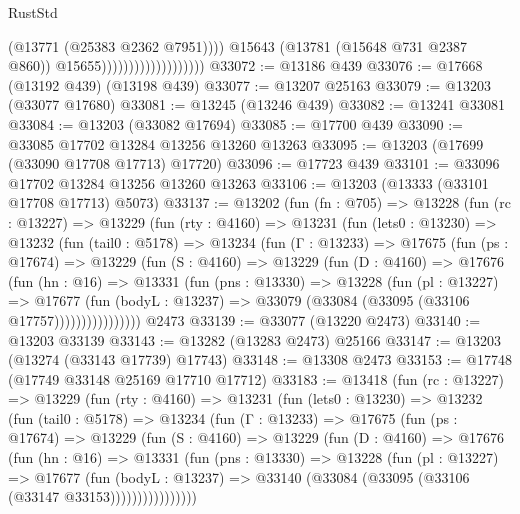 \begin{lexlean}{RustStd}
\begin{coremodule}
                                              (@13771 (@25383 @2362 @7951))))
                                          @15643
                                          (@13781 (@15648 @731 @2387 @860))
                                          @15655)))))))))))))))))))
@33072 := @13186 @439
@33076 := @17668 (@13192 @439) (@13198 @439)
@33077 := @13207 @25163
@33079 := @13203 (@33077 @17680)
@33081 := @13245 (@13246 @439)
@33082 := @13241 @33081
@33084 := @13203 (@33082 @17694)
@33085 := @17700 @439
@33090 := @33085 @17702 @13284 @13256 @13260 @13263
@33095 := @13203 (@17699 (@33090 @17708 @17713) @17720)
@33096 := @17723 @439
@33101 := @33096 @17702 @13284 @13256 @13260 @13263
@33106 := @13203 (@13333 (@33101 @17708 @17713) @5073)
@33137 := @13202
    (fun (fn : @705) =>
    @13228
      (fun (rc : @13227) =>
      @13229
        (fun (rty : @4160) =>
        @13231
          (fun (lets0 : @13230) =>
          @13232
            (fun (tail0 : @5178) =>
            @13234
              (fun (Γ : @13233) =>
              @17675
                (fun (ps : @17674) =>
                @13229
                  (fun (S : @4160) =>
                  @13229
                    (fun (D : @4160) =>
                    @17676
                      (fun (hn : @16) =>
                      @13331
                        (fun (pns : @13330) =>
                        @13228
                          (fun (pl : @13227) =>
                          @17677
                            (fun (bodyL : @13237) =>
                            @33079 (@33084 (@33095 (@33106 @17757))))))))))))))))
    @2473
@33139 := @33077 (@13220 @2473)
@33140 := @13203 @33139
@33143 := @13282 (@13283 @2473) @25166
@33147 := @13203 (@13274 (@33143 @17739) @17743)
@33148 := @13308 @2473
@33153 := @17748 (@17749 @33148 @25169 @17710 @17712)
@33183 := @13418
    (fun (rc : @13227) =>
    @13229
      (fun (rty : @4160) =>
      @13231
        (fun (lets0 : @13230) =>
        @13232
          (fun (tail0 : @5178) =>
          @13234
            (fun (Γ : @13233) =>
            @17675
              (fun (ps : @17674) =>
              @13229
                (fun (S : @4160) =>
                @13229
                  (fun (D : @4160) =>
                  @17676
                    (fun (hn : @16) =>
                    @13331
                      (fun (pns : @13330) =>
                      @13228
                        (fun (pl : @13227) =>
                        @17677
                          (fun (bodyL : @13237) =>
                          @33140 (@33084 (@33095 (@33106 (@33147 @33153))))))))))))))))

\end{coremodule}
\end{lexlean}
